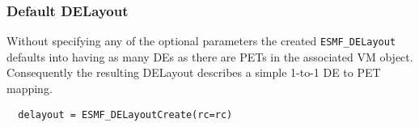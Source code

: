  
\setlength{\oldparskip}{\parskip}
\setlength{\parskip}{1.5ex}
\setlength{\oldparindent}{\parindent}
\setlength{\parindent}{0pt}
\setlength{\oldbaselineskip}{\baselineskip}
\setlength{\baselineskip}{11pt}
 
\def\bv{\begin{verbatim}}
\def\ev{\end{verbatim}}
\def\be{\begin{equation}}
\def\ee{\end{equation}}
\def\bea{\begin{eqnarray}}
\def\eea{\end{eqnarray}}
\def\bi{\begin{itemize}}
\def\ei{\end{itemize}}
\def\bn{\begin{enumerate}}
\def\en{\end{enumerate}}
\def\bd{\begin{description}}
\def\ed{\end{description}}
\def\({\left (}
\def\){\right )}
\def\[{\left [}
\def\]{\right ]}
\def\<{\left  \langle}
\def\>{\right \rangle}
\def\cI{{\cal I}}
\def\diag{\mathop{\rm diag}}
\def\tr{\mathop{\rm tr}}


 

   \subsubsection{Default DELayout}
   
   Without specifying any of the optional parameters the created 
   {\tt ESMF\_DELayout}
   defaults into having as many DEs as there are PETs in the associated VM 
   object. Consequently the resulting DELayout describes a simple 1-to-1 DE to
   PET mapping. 

 \begin{verbatim}
  delayout = ESMF_DELayoutCreate(rc=rc)
 
\end{verbatim}
 
